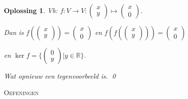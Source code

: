 \documentclass[a4paper,12pt]{article}
\newtheorem{oplossing}{Oplossing}
\begin{document}
\begin{enumerate}
\begin{itemize}
\begin{oplossing}
        Vb: \(f: V \to V: \begin{pmatrix}
            x \\
            y
        \end{pmatrix}
        \mapsto
        \begin{pmatrix}
            x \\
            0
        \end{pmatrix}
         \).
         
         Dan is \(f \left(\begin{pmatrix}
            x \\
            y
        \end{pmatrix}\right) 
        = \begin{pmatrix}
            x \\
            0
        \end{pmatrix}
         \)
        en \(f\left(f \left(\begin{pmatrix}
            x \\
            y
        \end{pmatrix}\right)\right)
        = \begin{pmatrix}
            x \\
            0
        \end{pmatrix}
         \)

         en \(\ker f = \{\begin{pmatrix}
            0 \\
            y
        \end{pmatrix} | y \in \mathbb{R}\}\).

        Wat opnieuw een tegenvoorbeeld is. \qed
    \end{oplossing}
\end{itemize}

\newpage

\begin{center}
    \textsc{Oefeningen}
\end{center}


\vspace{0.5cm}


\end{enumerate}
\end{document}
